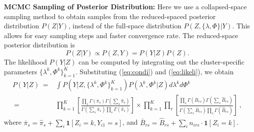 {\bf MCMC Sampling of Posterior Distribution:}
Here we use a collapsed-space sampling method \cite{neal2000markov,collapsed_escobar} to obtain samples from the reduced-spaced posterior distribution $P(Z|Y)$, instead of the full-space distribution $P(Z, \{\lambda, \Phi\} | Y)$. This allows for easy sampling steps and faster convergence rate. 
The reduced-space posterior distribution is
\begin{equation*}
 P(Z|Y) \propto P(Z, Y) = P(Y|Z) P(Z).
\end{equation*}
The likelihood $P(Y|Z)$ can be computed by integrating out the cluster-specific parameters $\{\lambda^k, \Phi^k\}_{k=1}^K$.
Substituting  (\ref{eq:condi}) and (\ref{eq:likeli}), we obtain
\begin{equation*}
\renewcommand*{\arraystretch}{1.9}
\begin{array}{rl}
     P(Y|Z) 
~ = & \int  P(Y| Z, \{\lambda^k, \Phi^k \}_{k=1}^K) P(\lambda^k, \Phi^k | Z) d\lambda^k d\Phi^{k} \\
~ = & \displaystyle{ \prod_{k=1}^K 
      \left[ 
      \frac{\prod_s \Gamma(\bar \pi_s) \Gamma (\sum_s \hat \pi_s)}
           {\Gamma\left( \sum_s \bar \pi_s \right) \prod_s \Gamma (\hat \pi_s)}
      \right]  } \times
    \displaystyle{ \prod_{k=1}^K \prod_r 
      \left[ 
      \frac{\prod_s \Gamma(\bar B_{rs}) \Gamma (\sum_s \hat B_{rs})}
           {\Gamma\left( \sum_s \bar  B_{rs} \right) \prod_s \Gamma (\hat B_{rs})}
      \right] } ~,
\end{array}
\end{equation*}
where
$\bar \pi _s = \hat \pi_s + \sum_{i} \mathbf{1}[Z_i=k,Y_{i1} = s]$, and
$\bar B_{rs} = \hat B_{rs} + \sum_{i} n_{irs}  \cdot \mathbf{1}[Z_i=k]$.

